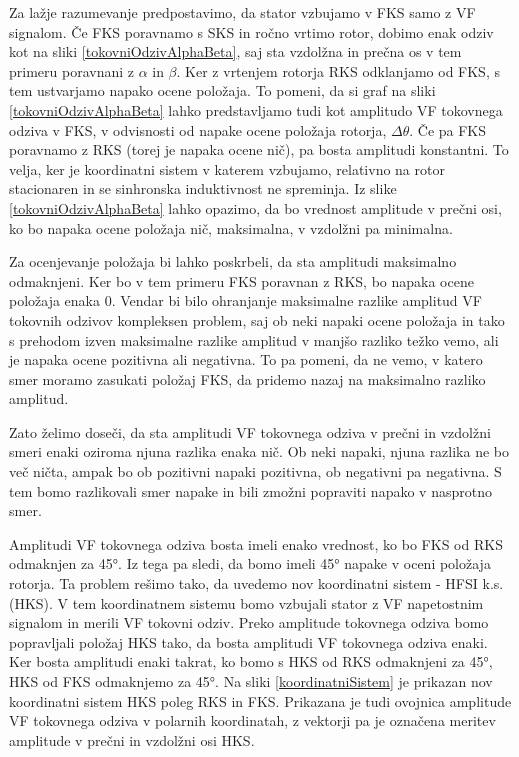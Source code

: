 \documentclass[a4paper,twoside,openright,12pt,slovene]{book}
\begin{document}
Za lažje razumevanje predpostavimo, da stator vzbujamo v FKS samo z VF signalom. Če FKS poravnamo s SKS in ročno vrtimo rotor, dobimo enak odziv kot na sliki \ref{tokovniOdzivAlphaBeta}, saj sta vzdolžna in
prečna os v tem primeru poravnani z $\alpha$ in $\beta$. Ker z vrtenjem rotorja RKS odklanjamo od FKS, s tem ustvarjamo napako ocene položaja. To pomeni, da si graf na sliki
\ref{tokovniOdzivAlphaBeta} lahko predstavljamo tudi kot amplitudo VF tokovnega odziva v FKS, v odvisnosti od napake ocene položaja rotorja, $\Delta\theta$. Če pa FKS poravnamo z RKS (torej je napaka ocene nič), 
pa bosta amplitudi konstantni. To velja, ker je koordinatni sistem v katerem vzbujamo, relativno na rotor stacionaren in se sinhronska induktivnost ne spreminja. 
Iz slike \ref{tokovniOdzivAlphaBeta} lahko opazimo, da bo vrednost amplitude v prečni osi, ko bo napaka ocene položaja nič, maksimalna, v vzdolžni pa minimalna. 

Za ocenjevanje položaja bi lahko poskrbeli, da sta amplitudi maksimalno odmaknjeni. Ker bo v tem primeru FKS poravnan z RKS, bo napaka ocene položaja enaka 0. Vendar bi bilo ohranjanje maksimalne
razlike amplitud VF tokovnih odzivov kompleksen problem, saj ob neki napaki ocene položaja in tako s prehodom izven maksimalne razlike amplitud v manjšo razliko težko vemo, ali je napaka ocene
pozitivna ali negativna. To pa pomeni, da ne vemo, v katero smer moramo zasukati položaj FKS, da pridemo nazaj na maksimalno razliko amplitud.

Zato želimo doseči, da sta amplitudi VF tokovnega odziva v prečni in vzdolžni smeri enaki oziroma njuna razlika enaka nič. Ob neki napaki, njuna razlika ne bo več ničta, ampak bo ob pozitivni napaki
pozitivna, ob negativni pa negativna. S tem bomo razlikovali smer napake in bili zmožni popraviti napako v nasprotno smer. 

Amplitudi VF tokovnega odziva bosta imeli enako vrednost, ko bo FKS od RKS odmaknjen za 45°. Iz tega pa sledi, da bomo imeli 45° napake v oceni položaja rotorja. Ta problem
rešimo tako, da uvedemo nov koordinatni sistem - HFSI k.s. (HKS). V tem koordinatnem sistemu bomo vzbujali stator z VF napetostnim signalom in merili VF tokovni odziv. Preko amplitude tokovnega odziva
bomo popravljali položaj HKS tako, da bosta amplitudi VF tokovnega odziva enaki. Ker bosta amplitudi enaki takrat, ko bomo s HKS od RKS odmaknjeni za 45°, HKS od FKS odmaknjemo za
45°. 
\newpage
Na sliki \ref{koordinatniSistem} je prikazan nov koordinatni sistem HKS poleg RKS in FKS. Prikazana je tudi ovojnica amplitude VF tokovnega odziva v polarnih koordinatah, z vektorji pa je označena
meritev amplitude v prečni in vzdolžni osi HKS. 
\end{document}
